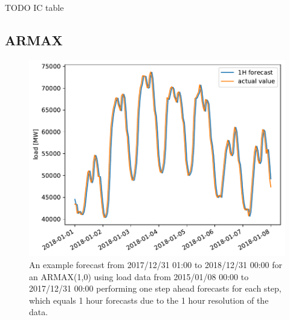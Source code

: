 TODO IC table

\subsection*{ARMAX}

\begin{figure}[h!]%
\centering
\includegraphics[width=\textwidth]{plots/ARMAXfc/ARMAX_p1q0_data2015to2017_fcto2018123100_plot_range2018010100_2018010800}%
\caption{An example forecast from 2017/12/31 01:00 to 2018/12/31 00:00 for an ARMAX(1,0) using load data from 2015/01/08 00:00 to 2017/12/31 00:00 performing one step ahead forecasts for each step, which equals 1 hour forecasts due to the 1 hour resolution of the data.}%
\label{fig:armax_fc}%
\end{figure}

